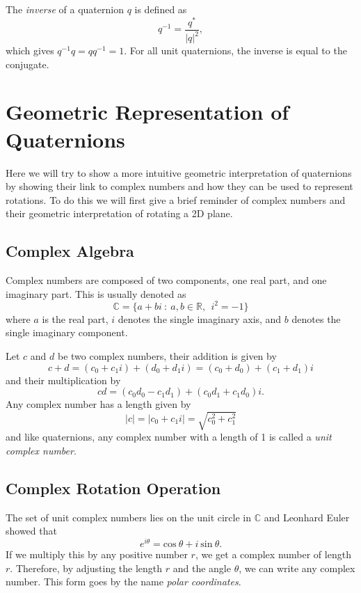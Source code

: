 The \textit{inverse} of a quaternion $q$ is defined as 
\begin{equation*}
q^{-1} = \frac{q^*}{|q|^2},
\end{equation*}
which gives $q^{-1}q = qq^{-1} = 1.$
For all unit quaternions, the inverse is equal to the conjugate.


\section{Geometric Representation of Quaternions}
Here we will try to show a more intuitive geometric interpretation of quaternions by showing their link to complex numbers and how they can be used to represent rotations.
To do this we will first give a brief reminder of complex numbers and their geometric interpretation of rotating a 2D plane.

\subsection{Complex Algebra}
Complex numbers are composed of two components, one real part, and one imaginary part.
This is usually denoted as
\begin{equation}
\mathbb{C} = \{a + bi~:~a,b \in \mathbb{R}, ~~i^2=-1\}
\label{eq:complexalgebra}
\end{equation}
where $a$ is the real part, $i$ denotes the single imaginary axis, and $b$ denotes the single imaginary component.

Let $c$ and $d$ be two complex numbers, their addition is given by
\begin{equation}
c + d = (c_0 + c_1i) + (d_0 + d_1i) = (c_0+d_0) + (c_1+d_1)i
\label{eq:complexaddition}
\end{equation}
and their multiplication by
\begin{equation}
cd = (c_0d_0 - c_1d_1) + (c_0d_1 + c_1d_0)i.
\label{eq:complexmult}
\end{equation}
Any complex number has a length given by
\begin{equation}
|c| = |c_0+c_1i| = \sqrt{c_0^2 + c_1^2}
\label{eq:complexlength}
\end{equation}
and like quaternions, any complex number with a length of 1 is called a \textit{unit complex number}.


\subsection{Complex Rotation Operation}
The set of unit complex numbers lies on the unit circle in $\mathbb{C}$ and Leonhard Euler showed that
\begin{equation}
e^{i\theta} = \mbox{cos}~\theta + i~\mbox{sin}~\theta.
\label{eq:euler}
\end{equation}
If we multiply this by any positive number $r$, we get a complex number of length $r$.
Therefore, by adjusting the length $r$ and the angle $\theta$, we can write any complex number.
This form goes by the name \textit{polar coordinates}.

